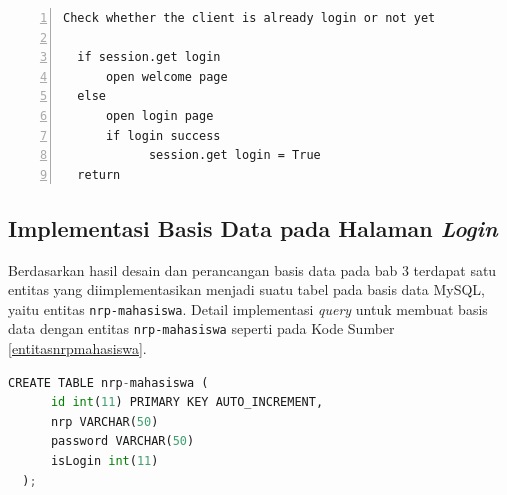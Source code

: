   \begin{minipage}{\linewidth}  
  \begin{lstlisting}[numbers=left, frame=single,tabsize=2,breaklines,caption={Pseudocode Web Service},label=pseudocodehalamanlogin]
  Check whether the client is already login or not yet
  	
  if session.get login
	  open welcome page
  else
	  open login page
	  if login success
			session.get login = True	  
  return  	
  \end{lstlisting}
  \end{minipage}
  
  
  \subsection{Implementasi Basis Data pada Halaman \textit{Login}}
  Berdasarkan hasil desain dan perancangan basis data pada bab 3 terdapat satu entitas yang diimplementasikan menjadi suatu tabel pada basis data MySQL, yaitu entitas \texttt{nrp-mahasiswa}. Detail implementasi \textit{query} untuk membuat basis data dengan entitas \texttt{nrp-mahasiswa} seperti pada Kode Sumber \ref{entitasnrpmahasiswa}.\\
  \begin{minipage}{\linewidth}
  \begin{lstlisting}[language=python, caption=\textit{Query} untuk membuat tabel testing,label=entitasnrpmahasiswa]
  CREATE TABLE nrp-mahasiswa (
	  id int(11) PRIMARY KEY AUTO_INCREMENT,
	  nrp VARCHAR(50)
	  password VARCHAR(50)
	  isLogin int(11)
  );
  \end{lstlisting}
  \end{minipage}
    
